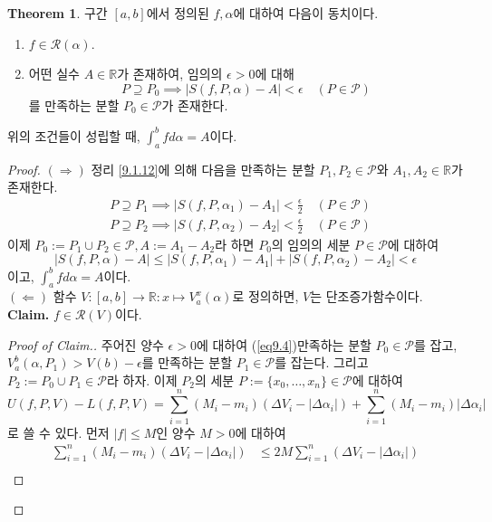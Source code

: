 \documentclass[11pt]{book}
\numberwithin{equation}{chapter}
\def\RR{\mathbb{R}}
\def\eps{\epsilon}
\def\calP{\mathcal{P}}
\def\calR{\mathcal{R}}
\newcommand{\abs}[1]{\left\vert#1\right\vert}
\theoremstyle{definition}
\newtheorem{thm}{Theorem}[section]
\newenvironment{enum}
	{\begin{enumerate}[label=(\alph*), leftmargin=2\parindent]}
	{\end{enumerate}}
\begin{document}
\begin{thm}
    구간 \([a, b]\)에서 정의된 \(f, \alpha\)에 대하여 다음이 동치이다.
    \begin{enum}
        \item \(f \in \calR(\alpha)\).
        \item 어떤 실수 \(A \in \RR\)가 존재하여, 임의의 \(\eps > 0\)에 대해
        \begin{equation} \label{eq9.4}
            P \supseteq P_0 \implies \abs{S(f, P, \alpha) - A} < \eps \quad (P \in \calP)
        \end{equation}
        를 만족하는 분할 \(P_0 \in \calP\)가 존재한다.
    \end{enum}
    위의 조건들이 성립할 때, \(\displaystyle \int_a^b f d\alpha = A\)이다.
\end{thm}
\begin{proof}
    \((\Rightarrow)\) 정리 \ref{9.1.12}에 의해 다음을 만족하는 분할 \(P_1, P_2 \in \calP\)와 \(A_1, A_2 \in \RR\)가 존재한다.
    \begin{align*}
        &P \supseteq P_1 \implies \abs{S(f, P, \alpha_1) - A_1} < \frac{\eps}{2} \quad (P \in \calP)\\
        &P \supseteq P_2 \implies \abs{S(f, P, \alpha_2) - A_2} < \frac{\eps}{2} \quad (P \in \calP)
    \end{align*}
    이제 \(P_0 := P_1 \cup P_2 \in \calP, A := A_1 - A_2\)라 하면 \(P_0\)의 임의의 세분 \(P \in \calP\)에 대하여
    \[
        \abs{S(f, P, \alpha) - A} \le \abs{S(f, P, \alpha_1) - A_1} + \abs{S(f, P, \alpha_2) - A_2} < \eps
    \]
    이고, \(\displaystyle \int_a^b f d\alpha = A\)이다.\\
    \((\Leftarrow)\) 함수 \(V : [a, b] \to \RR : x \mapsto V_a^x(\alpha)\)로 정의하면, \(V\)는 단조증가함수이다.\\
    \textbf{Claim.} \(f \in \calR(V)\)이다.
    \begin{proof}[Proof of Claim.]
        주어진 양수 \(\eps > 0\)에 대하여 (\ref{eq9.4})\를 만족하는 분할 \(P_0 \in \calP\)를 잡고, \(V_a^b(\alpha, P_1) > V(b) - \eps\)를 만족하는 분할 \(P_1 \in \calP\)를 잡는다. 그리고 \(P_2 := P_0 \cup P_1 \in \calP\)라 하자. 이제 \(P_2\)의 세분 \(P := \{x_0, \ldots, x_n\}\in \calP\)에 대하여
        \[
            U(f, P, V) - L(f, P, V) = \sum_{i=1}^n (M_i - m_i) (\Delta V_i - \abs{\Delta \alpha_i}) + \sum_{i=1}^n (M_i - m_i) \abs{\Delta \alpha_i}
        \]
        로 쓸 수 있다. 먼저 \(\abs{f} \le M\)인 양수 \(M > 0\)에 대하여
        \begin{align*}
            \sum_{i=1}^n (M_i - m_i) (\Delta V_i - \abs{\Delta \alpha_i}) &\le 2M \sum_{i=1}^n (\Delta V_i - \abs{\Delta \alpha_i})\\

\end{align*}
\end{proof}
\end{proof}
\end{document}
